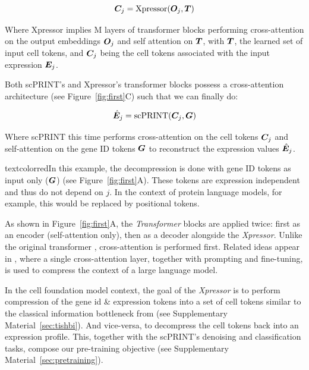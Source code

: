 \begin{equation}
{\bm{C}}_j = \mathrm{Xpressor}({\bm{O}}_j, {\bm{T}})
\label{eq:compression2}
\end{equation}

Where Xpressor implies M layers of transformer blocks performing cross-attention on the output embeddings ${\bm{O}}_j$ and self attention on ${\bm{T}}$, with ${\bm{T}}$, the learned set of input cell tokens, and ${\bm{C}}_j$ being the cell tokens associated with the input expression ${\bm{E}}_j$.

Both scPRINT's and Xpressor's transformer blocks possess a cross-attention architecture (see Figure~\ref{fig:first}C) such that we can finally do:

\begin{equation}
\hat{{\bm{E}}}_j = \mathrm{scPRINT}({\bm{C}}_j, {\bm{G}})
\label{eq:decompression}
\end{equation}

Where scPRINT this time performs cross-attention on the cell tokens ${\bm{C}}_j$ and self-attention on the gene ID tokens ${\bm{G}}$ to reconstruct the expression values $\hat{{\bm{E}}}_j$.

textcolor{red}{In this example, the decompression is done with gene ID tokens as input only (${\bm{G}}$) (see Figure~\ref{fig:first}A). These tokens are expression independent} and thus do not depend on $j$. In the context of protein language models, for example, this would be replaced by positional tokens.

As shown in Figure~\ref{fig:first}A, the \emph{Transformer} blocks are applied twice: first as an encoder (self-attention only), then as a decoder alongside the \emph{Xpressor}. Unlike the original transformer \citep{vaswaniAttentionAllYou2023}, cross-attention is performed first. Related ideas appear in \citet{leeNVEmbedImprovedTechniques2025}, where a single cross-attention layer, together with prompting and fine-tuning, is used to compress the context of a large language model.

In the cell foundation model context, the goal of the \emph{Xpressor} is to perform compression of the gene id \& expression tokens into a set of cell tokens similar to the classical information bottleneck from \citet{tishbyInformationBottleneckMethoda} (see Supplementary Material~\ref{sec:tishbi}). And vice-versa, to decompress the cell tokens back into an expression profile. This, together with the scPRINT's denoising and classification tasks, compose our pre-training objective (see Supplementary Material~\ref{sec:pretraining}).

